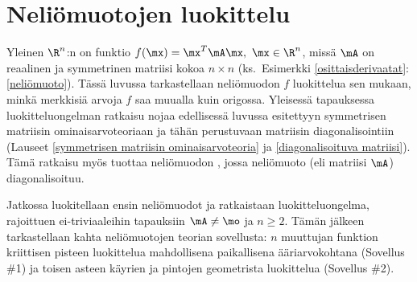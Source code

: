 \section{Neliömuotojen luokittelu} \label{diagonalisointi}
\alku
{}

Yleinen $\R^n$:n  on funktio $f(\mx)=\mx^T\mA\mx,\ \mx\in\R^n$, missä $\mA$ on
reaalinen ja symmetrinen matriisi kokoa $n\times n$ 
(ks.\ Esimerkki \ref{osittaisderivaatat}:\,\ref{neliömuoto}). Tässä luvussa tarkastellaan
neliömuodon $f$ luokittelua sen mukaan, minkä merkkisiä arvoja $f$ saa muualla kuin origossa.
Yleisessä tapauksessa luokitteluongelman ratkaisu nojaa edellisessä luvussa esitettyyn
symmetrisen matriisin ominais\-arvoteoriaan ja tähän perustuvaan matriisin diagonalisointiin
(Lauseet \ref{symmetrisen matriisin ominaisarvoteoria} ja \ref{diagonalisoituva matriisi}).
Tämä ratkaisu myös tuottaa neliömuodon , jossa neliömuoto
(eli matriisi $\mA$) diagonalisoituu.

Jatkossa luokitellaan ensin neliömuodot ja ratkaistaan luokitteluongelma, rajoittuen
ei-triviaaleihin tapauksiin $\mA\neq\mo$ ja $n \ge 2$. Tämän jälkeen tarkastellaan kahta
neliömuotojen teorian sovellusta: $n$ muuttujan funktion kriittisen pisteen luokittelua
mahdollisena paikallisena ääriarvokohtana (Sovellus \#1) ja toisen asteen käyrien ja pintojen
geometrista luokittelua (Sovellus \#2). 

